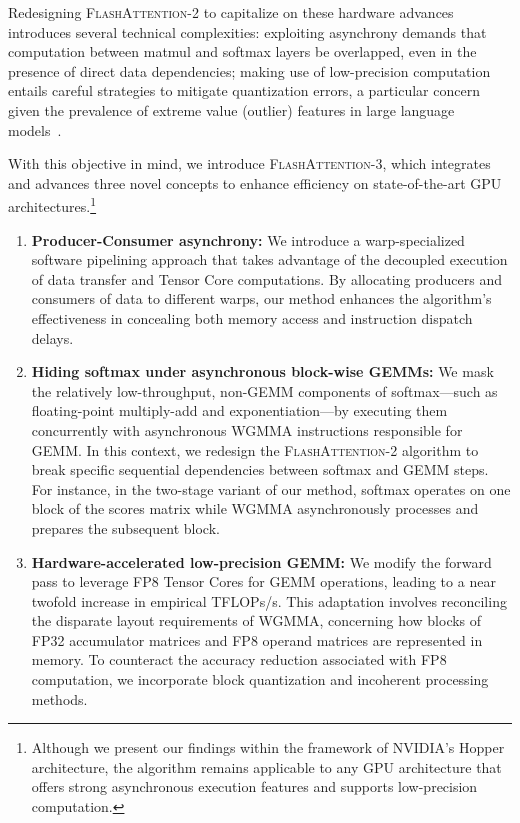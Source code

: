 Redesigning \textsc{FlashAttention-2} to capitalize on these hardware advances introduces several technical complexities: exploiting asynchrony demands that computation between matmul and softmax layers be overlapped, even in the presence of direct data dependencies; making use of low-precision computation entails careful strategies to mitigate quantization errors, a particular concern given the prevalence of extreme value (outlier) features in large language models~\citep{dettmers2208llm, sun2024massive}.

With this objective in mind, we introduce \textsc{FlashAttention-3}, which integrates and advances three novel concepts to enhance efficiency on state-of-the-art GPU architectures.\footnote{Although we present our findings within the framework of NVIDIA's Hopper architecture, the algorithm remains applicable to any GPU architecture that offers strong asynchronous execution features and supports low-precision computation.}

\begin{enumerate}

\item \textbf{Producer-Consumer asynchrony:} We introduce a warp-specialized software pipelining approach that takes advantage of the decoupled execution of data transfer and Tensor Core computations. By allocating producers and consumers of data to different warps, our method enhances the algorithm’s effectiveness in concealing both memory access and instruction dispatch delays.
\item \textbf{Hiding softmax under asynchronous block-wise GEMMs:} We mask the relatively low-throughput, non-GEMM components of softmax—such as floating-point multiply-add and exponentiation—by executing them concurrently with asynchronous WGMMA instructions responsible for GEMM. In this context, we redesign the \textsc{FlashAttention-2} algorithm to break specific sequential dependencies between softmax and GEMM steps. For instance, in the two-stage variant of our method, softmax operates on one block of the scores matrix while WGMMA asynchronously processes and prepares the subsequent block.
\item \textbf{Hardware-accelerated low-precision GEMM:} We modify the forward pass to leverage FP8 Tensor Cores for GEMM operations, leading to a near twofold increase in empirical TFLOPs/s. This adaptation involves reconciling the disparate layout requirements of WGMMA, concerning how blocks of FP32 accumulator matrices and FP8 operand matrices are represented in memory. To counteract the accuracy reduction associated with FP8 computation, we incorporate block quantization and incoherent processing methods.
\end{enumerate}

